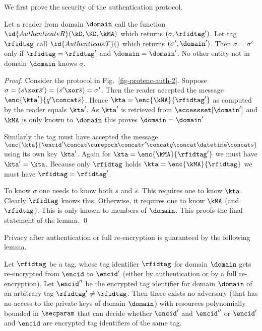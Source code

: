 We first prove the security of the authentication protocol.
\begin{lemma}
\label{lem-auth}
Let a reader from domain $\domain$ call the function
 $\id{AuthenticateR}(\kD,\KD,\kMA)$
which returns $(\sigma,\rfidtag')$. Let tag $\rfidtag$ call
$\id{AuthenticateT}()$ which returns $(\sigma',\domain')$. Then 
$\sigma=\sigma'$ only
if $\rfidtag = \rfidtag'$ and $\domain = \domain'$. No other entity not in
domain $\domain$ knows $\sigma$.
\end{lemma}
\begin{proof}
Consider the protocol in Fig.~\ref{fig-protenc-auth-2}.
Suppose $\sigma = (s \xor \bar{s}') = (s' \xor \bar{s}) =\sigma'$. 
Then the reader accepted the message
$\enc{\kta'}{q' \concat \bar{s}}$. Hence $\kta = \enc{\kMA}{\rfidtag'}$ as
computed by the reader equals $\kta'$. As
$\kta'$ is retrieved from $\accessset[\domain']$ and $\kMA$ is only known to
$\domain$ this proves $\domain = \domain'$

Similarly the tag must have accepted the message
$\enc{\kta}{\encid'\concat \curepoch \concat r' \concat q \concat \datetime \concat s}$
using its own key $\kta'$. Again
for $\kta = \enc{\kMA}{\rfidtag'}$
we must have $\kta'=\kta$. Because only $\rfidtag$ holds 
$\kta = \enc{\kMA}{\rfidtag}$ we must have $\rfidtag = \rfidtag'$.


To know $\sigma$ one needs to know both $s$ and $\bar{s}$. This requires one
to know $\kta$. Clearly $\rfidtag$ knows this. Otherwise, it requires one to
know $\kMA$ (and $\rfidtag$). This is only known to members of $\domain$. This
proofs the final statement of the lemma.
\qed
\end{proof}




Privacy after authentication or full re-encryption is guaranteed by the
following lemma.
\begin{lemma}
\label{lem-privacy}
Let $\rfidtag$ be a tag, whose tag identifier $\rfidtag$ for domain $\domain$
gets re-encrypted from $\encid$ to $\encid'$ (either by authentication or by a
full re-encryption). Let $\encid''$ be the encrypted tag identifier for domain
$\domain$ of an arbitrary tag $\rfidtag' \neq \rfidtag$. Then there exists no
adversary (that has no access to the private keys of domain $\domain$) with
resources polynomially bounded in $\secparam$ that can decide whether $\encid'$
and $\encid''$ or $\encid'$ and $\encid$ are encrypted tag identifiers of the
same tag.
\end{lemma}

